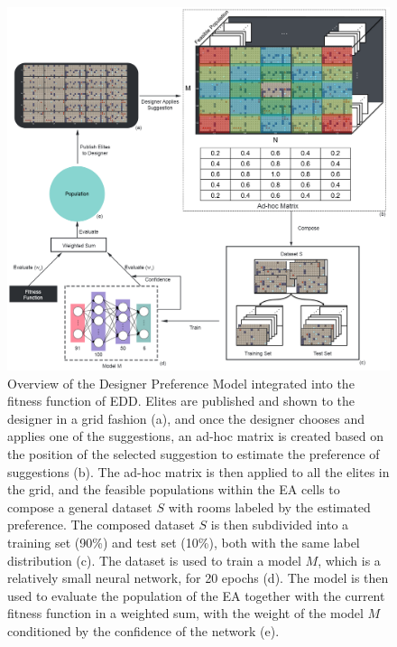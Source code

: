 \begin{figure}
\includegraphics[width=\textwidth]{figures/DesPref-figs/desPrefModel.png}
\caption{Overview of the Designer Preference Model integrated into the fitness function of EDD. Elites are published and shown to the designer in a grid fashion (a), and once the designer chooses and applies one of the suggestions, an ad-hoc matrix is created based on the position of the selected suggestion to estimate the preference of suggestions (b). The ad-hoc matrix is then applied to all the elites in the grid, and the feasible populations within the EA cells to compose a general dataset $S$ with rooms labeled by the estimated preference. The composed dataset $S$ is then subdivided into a training set (90\%) and test set (10\%), both with the same label distribution (c). The dataset is used to train a model $M$, which is a relatively small neural network, for 20 epochs (d). The  model is then used to evaluate the population of the EA together with the current fitness function in a weighted sum, with the weight of the model $M$ conditioned by the confidence of the network (e).} \label{fig:desPrefModel}
\end{figure}

